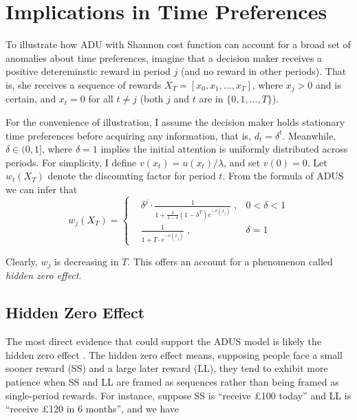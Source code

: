 \documentclass[
  12pt,
]{article}
\begin{document}
\hypertarget{implications-in-time-preferences}{%
\section{\texorpdfstring{Implications in Time Preferences
\label{behavioral}}{Implications in Time Preferences }}\label{implications-in-time-preferences}}

To illustrate how ADU with Shannon cost function can account for a broad
set of anomalies about time preferences, imagine that a decision maker
receives a positive detereminstic reward in period \(j\) (and no reward
in other periods). That is, she receives a sequence of rewards
\(X_T=[x_0,x_1,…,x_T]\), where \(x_j>0\) and is certain, and \(x_t = 0\)
for all \(t \neq j\) (both \(j\) and \(t\) are in \(\{0,1,...,T\}\)).

For the convenience of illustration, I assume the decision maker holds
stationary time preferences before acquiring any information, that is,
\(d_t=\delta^t\). Meanwhile, \(\delta\in(0,1]\), where \(\delta=1\)
implies the initial attention is uniformly distributed across periods.
For simplicity, I define \(v(x_t)=u(x_t)/\lambda\), and set \(v(0)=0\).
Let \(w_t(X_T)\) denote the discounting factor for period \(t\). From
the formula of ADUS we can infer that\[ 
w_j(X_T) = \left\{ \begin{aligned}
& \delta^j \cdot\frac{1}{1+\frac{\delta}{1-\delta}(1-\delta^T)e^{-v(x_j)}}\;, & 0<\delta<1 \\
& \frac{1}{1+T\cdot e^{-v(x_j)}}\; , & \delta=1
\end{aligned}
\right.
\]

Clearly, \(w_j\) is decreasing in \(T\). This offers an account for a
phenomenon called \emph{hidden zero effect}.

\hypertarget{hidden-zero-effect}{%
\subsection{Hidden Zero Effect}\label{hidden-zero-effect}}

The most direct evidence that could support the ADUS model is likely the
hidden zero effect \citep{magen_hidden-zero_2008}. The hidden zero
effect means, supposing people face a small sooner reward (SS) and a
large later reward (LL), they tend to exhibit more patience when SS and
LL are framed as sequences rather than being framed as single-period
rewards. For instance, suppose SS is ``receive £100 today'' and LL is
``receive £120 in 6 months'', and we have
\end{document}
